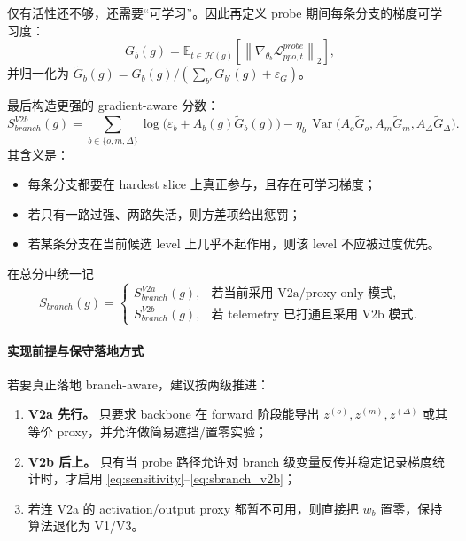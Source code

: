 \documentclass[11pt,a4paper]{ctexart}
\newcommand{\E}{\mathbb{E}}
\newcommand{\Var}{\operatorname{Var}}
\newcommand{\norm}[1]{\left\lVert #1 \right\rVert}
\begin{document}
仅有活性还不够，还需要“可学习”。因此再定义 probe 期间每条分支的梯度可学习度：
\begin{equation}
 G_b(g)=\E_{t\in\mathcal{H}(g)}\left[\norm{\nabla_{\theta_b}\mathcal{L}^{probe}_{ppo,t}}_2\right],
 \label{eq:Gb}
\end{equation}
并归一化为 \(\tilde G_b(g)=G_b(g)/(\sum_{b'}G_{b'}(g)+\varepsilon_G)\)。

最后构造更强的 gradient-aware 分数：
\begin{equation}
S_{branch}^{V2b}(g)=\sum_{b\in\{o,m,\Delta\}}\log\big(\varepsilon_b + A_b(g)\tilde G_b(g)\big) - \eta_b\,\Var\big(A_o\tilde G_o, A_m\tilde G_m, A_\Delta\tilde G_\Delta\big).
\label{eq:sbranch_v2b}
\end{equation}
其含义是：
\begin{itemize}[leftmargin=2.2em,itemsep=0.2em]
    \item 每条分支都要在 hardest slice 上真正参与，且存在可学习梯度；
    \item 若只有一路过强、两路失活，则方差项给出惩罚；
    \item 若某条分支在当前候选 level 上几乎不起作用，则该 level 不应被过度优先。
\end{itemize}

在总分中统一记
\begin{equation}
S_{branch}(g)=
\begin{cases}
S_{branch}^{V2a}(g), & \text{若当前采用 V2a/proxy-only 模式},\\
S_{branch}^{V2b}(g), & \text{若 telemetry 已打通且采用 V2b 模式}.
\end{cases}
\label{eq:sbranch}
\end{equation}

\paragraph{实现前提与保守落地方式}
若要真正落地 branch-aware，建议按两级推进：
\begin{enumerate}[leftmargin=2.2em,itemsep=0.2em]
    \item \textbf{V2a 先行。} 只要求 backbone 在 forward 阶段能导出 \(z^{(o)},z^{(m)},z^{(\Delta)}\) 或其等价 proxy，并允许做简易遮挡/置零实验；
    \item \textbf{V2b 后上。} 只有当 probe 路径允许对 branch 级变量反传并稳定记录梯度统计时，才启用 \eqref{eq:sensitivity}--\eqref{eq:sbranch_v2b}；
    \item 若连 V2a 的 activation/output proxy 都暂不可用，则直接把 \(w_b\) 置零，保持算法退化为 V1/V3。
\end{enumerate}
\end{document}

